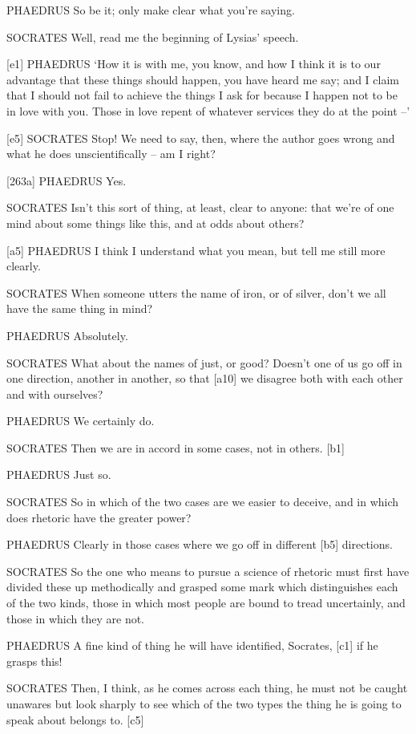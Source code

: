 PHAEDRUS So be it; only make clear what you're saying.

SOCRATES Well, read me the beginning of Lysias' speech.

{[}e1{]} PHAEDRUS ‘How it is with me, you know, and how I think it is to
our advantage that these things should happen, you have heard me say;
and I claim that I should not fail to achieve the things I ask for
because I happen not to be in love with you. Those in love repent of
whatever services they do at the point --'

{[}e5{]} SOCRATES Stop! We need to say, then, where the author goes
wrong and what he does unscientifically -- am I right?

{[}263a{]} PHAEDRUS Yes.

SOCRATES Isn't this sort of thing, at least, clear to anyone: that we're
of one mind about some things like this, and at odds about others?

{[}a5{]} PHAEDRUS I think I understand what you mean, but tell me still
more clearly.

SOCRATES When someone utters the name of iron, or of silver, don't we
all have the same thing in mind?

PHAEDRUS Absolutely.

SOCRATES What about the names of just, or
good? Doesn't one of us
go off in one direction, another in another, so that {[}a10{]} we
disagree both with each other and with ourselves?

PHAEDRUS We certainly do.

SOCRATES Then we are in accord in some cases, not in others. {[}b1{]}

PHAEDRUS Just so.

SOCRATES So in which of the two cases are we easier to deceive, and in
which does rhetoric have the greater power?

PHAEDRUS Clearly in those cases where we go off in different {[}b5{]}
directions.

SOCRATES So the one who means to pursue a science of rhetoric must first
have divided these up methodically and grasped some mark which
distinguishes each of the two kinds, those in which most
people are bound to
tread uncertainly, and those in which they are not.

PHAEDRUS A fine kind of thing he will have identified, Socrates,
{[}c1{]} if he grasps this!

SOCRATES Then, I think, as he comes across each thing, he must not be
caught unawares but look sharply to see which of the two types the thing
he is going to speak about belongs to. {[}c5{]}

